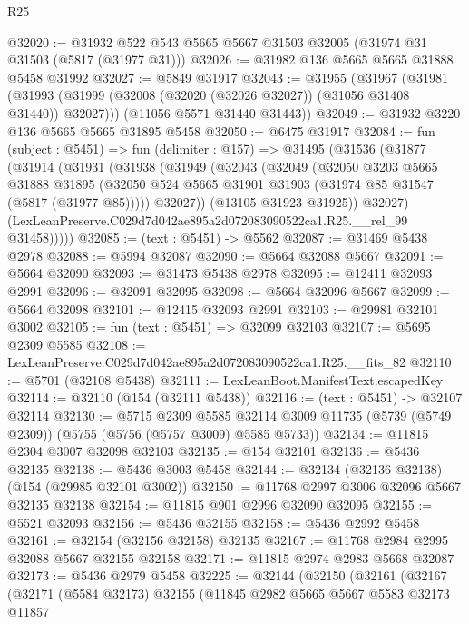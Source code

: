 \begin{lexlean}{R25}
\begin{coremodule}
@32020 := @31932 @522 @543 @5665 @5667 @31503 @32005 (@31974 @31 @31503 (@5817 (@31977 @31)))
@32026 := @31982 @136 @5665 @5665 @31888 @5458 @31992
@32027 := @5849 @31917
@32043 := @31955
    (@31967
      (@31981 (@31993 (@31999 (@32008 (@32020 (@32026 @32027)) (@31056 @31408 @31440)) @32027)))
      (@11056 @5571 @31440 @31443))
@32049 := @31932 @3220 @136 @5665 @5665 @31895 @5458
@32050 := @6475 @31917
@32084 := fun (subject : @5451) =>
  fun (delimiter : @157) =>
  @31495
    (@31536
      (@31877
        (@31914
          (@31931
            (@31938
              (@31949
                (@32043
                  (@32049
                    (@32050
                      @3203
                      @5665
                      @31888
                      @31895
                      (@32050 @524 @5665 @31901 @31903 (@31974 @85 @31547 (@5817 (@31977 @85)))))
                    @32027))
                (@13105 @31923 @31925))
              @32027)
            (LexLeanPreserve.C029d7d042ae895a2d072083090522ca1.R25.__rel_99 @31458)))))
@32085 := (text : @5451) -> @5562
@32087 := @31469 @5438 @2978
@32088 := @5994 @32087
@32090 := @5664 @32088 @5667
@32091 := @5664 @32090
@32093 := @31473 @5438 @2978
@32095 := @12411 @32093 @2991
@32096 := @32091 @32095
@32098 := @5664 @32096 @5667
@32099 := @5664 @32098
@32101 := @12415 @32093 @2991
@32103 := @29981 @32101 @3002
@32105 := fun (text : @5451) => @32099 @32103
@32107 := @5695 @2309 @5585
@32108 := LexLeanPreserve.C029d7d042ae895a2d072083090522ca1.R25.__fits_82
@32110 := @5701 (@32108 @5438)
@32111 := LexLeanBoot.ManifestText.escapedKey
@32114 := @32110 (@154 (@32111 @5438))
@32116 := (text : @5451) -> @32107 @32114
@32130 := @5715
    @2309
    @5585
    @32114
    @3009
    @11735
    (@5739 (@5749 @2309))
    (@5755 (@5756 (@5757 @3009) @5585 @5733))
@32134 := @11815 @2304 @3007 @32098 @32103
@32135 := @154 @32101
@32136 := @5436 @32135
@32138 := @5436 @3003 @5458
@32144 := @32134 (@32136 @32138) (@154 (@29985 @32101 @3002))
@32150 := @11768 @2997 @3006 @32096 @5667 @32135 @32138
@32154 := @11815 @901 @2996 @32090 @32095
@32155 := @5521 @32093
@32156 := @5436 @32155
@32158 := @5436 @2992 @5458
@32161 := @32154 (@32156 @32158) @32135
@32167 := @11768 @2984 @2995 @32088 @5667 @32155 @32158
@32171 := @11815 @2974 @2983 @5668 @32087
@32173 := @5436 @2979 @5458
@32225 := @32144
    (@32150
      (@32161
        (@32167
          (@32171
            (@5584 @32173)
            @32155
            (@11845
              @2982
              @5665
              @5667
              @5583
              @32173
              @11857

\end{coremodule}
\end{lexlean}
